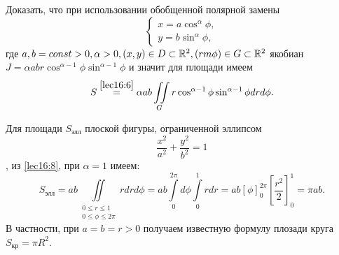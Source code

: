 \documentclass[../../main.tex]{subfiles}
\begin{document}
\begin{exercise}
	Доказать, что при использовании обобщенной полярной замены
	\begin{equation*}
	\begin{cases}
	x=a\cos^\alpha\phi,\\
	y=b\sin^\alpha\phi,
	\end{cases}
	\end{equation*}
	где $
	a,b=const>0,
	\alpha>0, (x,y)\in D \subset \mathbb{R}^2, (rm\phi)\in G\subset \mathbb{R}^2$
	якобиан $J=\alpha a b r \cos^{\alpha-1}\phi\sin^{\alpha-1}\phi$ и значит для 
	площади имеем
	\begin{equation}
	\label{lec16:8}
	S \overset{\ref{lec16:6}}{=} \alpha a b \iint\limits_G r\cos^{\alpha - 1}\phi
	\sin^{\alpha - 1}\phi dr d\phi.
	\end{equation}
\end{exercise}
	\begin{example}
	Для площади $S_{\text{элл}}$ плоской фигуры, ограниченной эллипсом
	\[
	\dfrac{x^2}{a^2} + \dfrac{y^2}{b^2} = 1
	\], 
	из \eqref{lec16:8}, при
	$ \alpha = 1 $ имеем:
	\begin{equation*}
	S_{\text{элл}} = 
	ab\iint\limits_
	{\begin{gathered}
		0\leq r\leq1\\
		0\leq \phi \leq 2\pi
		\end{gathered}
	 } rdrd \phi =
	ab \int\limits_0^{2\pi}d\phi\int\limits_0^1rdr =
	ab \left[\phi \right]^{2\pi}_0
	\left[\dfrac{r^2}{2}\right]_0^1 = \pi ab.
	\end{equation*}
	В частности, при $a = b = r > 0$ получаем известную формулу плозади круга 
	$S_{\text{кр}} = \pi R^2$.
\end{example}
\end{document}
